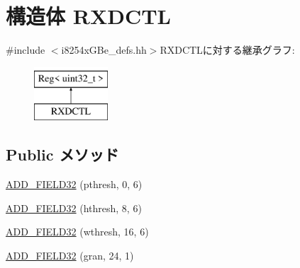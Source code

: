 \hypertarget{structiGbReg_1_1Regs_1_1RXDCTL}{
\section{構造体 RXDCTL}
\label{structiGbReg_1_1Regs_1_1RXDCTL}
}


{\ttfamily \#include $<$i8254xGBe\_\-defs.hh$>$}RXDCTLに対する継承グラフ:\begin{figure}[H]
\begin{center}
\leavevmode
\includegraphics[height=2cm]{structiGbReg_1_1Regs_1_1RXDCTL}
\end{center}
\end{figure}
\subsection*{Public メソッド}
\begin{DoxyCompactItemize}
\item 
\hyperlink{structiGbReg_1_1Regs_1_1RXDCTL_acca8f40dfe6ce58aac4678e3b089f191}{ADD\_\-FIELD32} (pthresh, 0, 6)
\item 
\hyperlink{structiGbReg_1_1Regs_1_1RXDCTL_a00a36d9608271e7fc1a9d567898beec9}{ADD\_\-FIELD32} (hthresh, 8, 6)
\item 
\hyperlink{structiGbReg_1_1Regs_1_1RXDCTL_a352305079deadad339f18b9f60b5791b}{ADD\_\-FIELD32} (wthresh, 16, 6)
\item 
\hyperlink{structiGbReg_1_1Regs_1_1RXDCTL_acdf2ad81a44f986c1547302a94bbfa34}{ADD\_\-FIELD32} (gran, 24, 1)
\end{DoxyCompactItemize}


